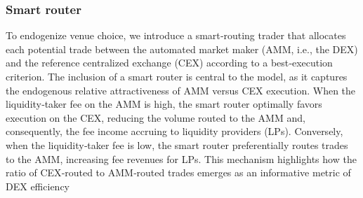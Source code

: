 \documentclass[11pt]{article}
\begin{document}



\subsubsection{Smart router}
To endogenize venue choice, we introduce a smart‑routing trader that allocates each potential trade between the automated market maker (AMM, i.e., the DEX) and the reference centralized exchange (CEX) according to a best‑execution criterion. The inclusion of a smart router is central to the model, as it captures the endogenous relative attractiveness of AMM versus CEX execution. When the liquidity‑taker fee on the AMM is high, the smart router optimally favors execution on the CEX, reducing the volume routed to the AMM and, consequently, the fee income accruing to liquidity providers (LPs). Conversely, when the liquidity‑taker fee is low, the smart router preferentially routes trades to the AMM, increasing fee revenues for LPs. This mechanism highlights how the ratio of CEX‑routed to AMM‑routed trades emerges as an informative metric of DEX efficiency
\end{document}
